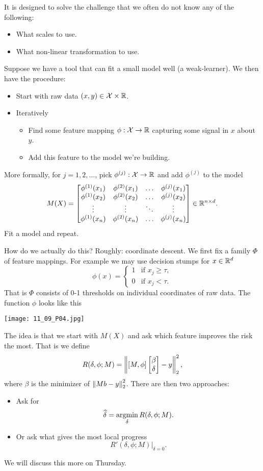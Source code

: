 It is designed to solve the challenge that we often do not know any of the following:
\begin{itemize}
    \item What scales to use.
    \item What non-linear transformation to use.
\end{itemize}
Suppose we have a tool that can fit a small model well (a weak-learner). We then have the procedure:
\begin{itemize}
    \item Start with raw data $(x,y) \in {\mathcal{X}} \times {\mathbb R}$.
    \item Iteratively\begin{itemize}
        \item Find some feature mapping $\phi : {\mathcal{X}} \to {\mathbb R}$ capturing some signal in $x$ about $y$.
        \item Add this feature to the model we're building.
    \end{itemize}
\end{itemize}
More formally, for $j=1,2,\ldots$, pick $\phi^{(j)} : {\mathcal{X}} \to {\mathbb R}$ and add $\phi^{(j)}$ to the model
\[M(X) = \begin{bmatrix}
    \phi^{(1)}(x_1)&\phi^{(2)}(x_1)&\ldots & \phi^{(j)}(x_1)\\
    \phi^{(1)}(x_2)&\phi^{(2)}(x_2)&\ldots & \phi^{(j)}(x_2)\\
    \vdots & \vdots & \ddots & \vdots \\
    \phi^{(1)}(x_n)&\phi^{(2)}(x_n)&\ldots & \phi^{(j)}(x_n) 
\end{bmatrix}\in {\mathbb R}^{n \times d}. \]
Fit a model and repeat. 

How do  we actually do this? Roughly: coordinate descent. We first fix a family $\Phi$ of feature mappings. For example we may use decision stumps for $x \in {\mathbb R}^d$
\[\phi(x) = \begin{cases}
    1 & \text{if } x_j \ge \tau,\\
    0 & \text{if } x_j < \tau.
\end{cases} \]
That is $\Phi$ consists of 0-1 thresholds on individual coordinates of raw data. The function $\phi$ looks like this

\begin{center}
    \texttt{[image: 11\_09\_P04.jpg]}
\end{center}

The idea is that we start with $M(X)$ and ask which feature improves the risk the most. That is we define 
\[R(\delta,\phi; M) = \left\|[M,\phi]\begin{bmatrix}\beta\\ \delta \end{bmatrix} - y\right\|_2^2, \]
where $\beta$ is the minimizer of $\left\|Mb-y\right\|_2^2$. There are then two approaches:
\begin{itemize}
    \item Ask for
    \[\widehat{\delta} = \operatorname*{argmin}_\delta R(\delta, \phi;M).\]
    \item Or ask what gives the most local progress 
    \[R'(\delta,\phi;M)|_{\delta = 0}.\]
\end{itemize}
We will discuss this more on Thursday. 

